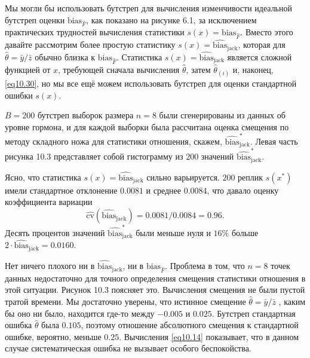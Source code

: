 Мы могли бы использовать бутстреп для вычисления изменчивости идеальной бутстреп оценки $\text{bias}_{\hat{F}}$, как показано на рисунке 6.1, за исключением практических трудностей вычисления статистики $s(x) = \text{bias}_{\hat{F}}$. Вместо этого давайте рассмотрим более простую статистику $s(x) = \widehat{\text{bias}}_{\text{jack}}$, которая для $\hat{\theta} = \bar{y}/\bar{z}$ обычно близка к $\text{bias}_{\hat{F}}$. Статистика $s(x) = \widehat{\text{bias}}_{\text{jack}}$ является сложной функцией от $x$, требующей сначала вычисления $\hat{\theta}$, затем $\hat{\theta}_{(i)}$ и, наконец, \ref{eq10.30}, но мы все ещё можем использовать бутстреп для оценки стандартной ошибки $s(x)$.

$B = 200$ бутстреп выборок размера $n = 8$ были сгенерированы из данных об уровне гормона, и для каждой выборки была рассчитана оценка смещения по методу складного ножа для статистики отношения, скажем, $\widehat{\text{bias}}_{\text{jack}}^{*}$. Левая часть рисунка 10.3 представляет собой гистограмму из $200$ значений $\widehat{\text{bias}}_{\text{jack}}^{*}$.

Ясно, что статистика $s(x) = \widehat{\text{bias}}_{\text{jack}}$ сильно варьируется. $200$ реплик $s(x^{*})$ имели стандартное отклонение $0.0081$ и среднее $0.0084$, что давало оценку коэффициента вариации 
\begin{equation}\label{eq10.33}
    \widehat{\text{cv}}(\widehat{\text{bias}}_{\text{jack}}) = 0.0081/0.0084 = 0.96.
\end{equation}
Десять процентов значений $\widehat{\text{bias}}_{\text{jack}}^{*}$ были меньше нуля и $16\%$ больше $2\cdot \widehat{\text{bias}}_{\text{jack}} = 0.0160$.

Нет ничего плохого ни в $\widehat{\text{bias}}_{\text{jack}}$, ни в $\text{bias}_{\hat{F}}$. Проблема в том, что $n = 8$ точек данных недостаточно для точного определения смещения статистики отношения в этой ситуации. Рисунок 10.3 поясняет это. Вычисления смещения не были пустой тратой времени. Мы достаточно уверены, что истинное смещение $\hat{\theta} = \bar{y}/\bar{z}$ , каким бы оно ни было, находится где-то между $-0.005$ и $0.025$. Бутстреп стандартная ошибка $\hat{\theta}$ была $0.105$, поэтому отношение абсолютного смещения к стандартной ошибке, вероятно, меньше $0.25$. Вычисления \ref{eq10.14} показывает, что в данном случае систематическая ошибка не вызывает особого беспокойства.

